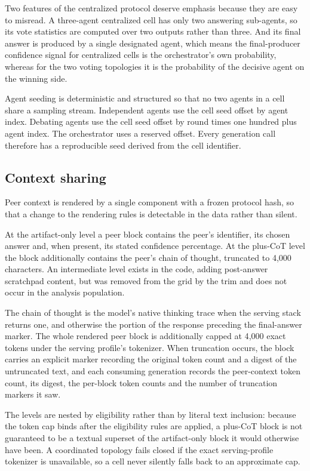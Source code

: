 Two features of the centralized protocol deserve emphasis because they are easy to
misread. A three-agent centralized cell has only two answering sub-agents, so its vote
statistics are computed over two outputs rather than three. And its final answer is
produced by a single designated agent, which means the final-producer confidence signal
for centralized cells is the orchestrator's own probability, whereas for the two voting
topologies it is the probability of the decisive agent on the winning side.

Agent seeding is deterministic and structured so that no two agents in a cell share a
sampling stream. Independent agents use the cell seed offset by agent index. Debating
agents use the cell seed offset by round times one hundred plus agent index. The
orchestrator uses a reserved offset. Every generation call therefore has a reproducible
seed derived from the cell identifier.

\subsection{Context sharing}

Peer context is rendered by a single component with a frozen protocol hash, so that a
change to the rendering rules is detectable in the data rather than silent.

At the artifact-only level a peer block contains the peer's identifier, its chosen answer
and, when present, its stated confidence percentage. At the plus-CoT level the block
additionally contains the peer's chain of thought, truncated to 4{,}000 characters. An
intermediate level exists in the code, adding post-answer scratchpad content, but was
removed from the grid by the trim and does not occur in the analysis population.

The chain of thought is the model's native thinking trace when the serving stack returns
one, and otherwise the portion of the response preceding the final-answer marker. The
whole rendered peer block is additionally capped at 4{,}000 exact tokens under the serving
profile's tokenizer. When truncation occurs, the block carries an explicit marker
recording the original token count and a digest of the untruncated text, and each
consuming generation records the peer-context token count, its digest, the per-block token
counts and the number of truncation markers it saw.

The levels are nested by eligibility rather than by literal text inclusion: because the
token cap binds after the eligibility rules are applied, a plus-CoT block is not
guaranteed to be a textual superset of the artifact-only block it would otherwise have
been. A coordinated topology fails closed if the exact serving-profile tokenizer is
unavailable, so a cell never silently falls back to an approximate cap.

